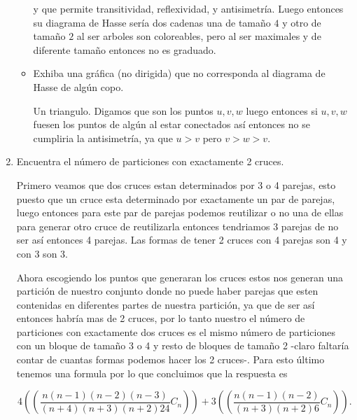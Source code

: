 \documentclass[letterpaper]{article}
\theoremstyle{definition}
\theoremstyle{lemathm}
\theoremstyle{lemademthm}
\newcommand{\pars}[1]{\left( #1 \right) }
\newcommand{\1}{\mathbbm{1}}
\begin{document}
\begin{enumerate}
\begin{itemize}
			y que permite transitividad, reflexividad, y antisimetría. Luego entonces su diagrama de Hasse sería dos cadenas una de tamaño $4$ y otro de tamaño $2$ al ser arboles son coloreables, pero al ser maximales y de diferente tamaño entonces no es graduado.
			
			\item Exhiba una gráfica (no dirigida) que no corresponda al diagrama de Hasse de algún copo.
			
			Un triangulo. Digamos que son los puntos $u,v,w$ luego entonces si $u,v,w$ fuesen los puntos de algún al estar conectados así entonces no se cumpliria la antisimetría, ya que $u>v$ pero $v>w>v$.
			
		\end{itemize}
		
		\item Encuentra el número de particiones con exactamente 2 cruces.
		
		Primero veamos que dos cruces estan determinados por 3 o 4 parejas, esto puesto que un cruce esta determinado por exactamente un par de parejas, luego entonces para este par de parejas podemos reutilizar o no una de ellas para generar otro cruce de reutilizarla entonces tendriamos 3 parejas de no ser así entonces 4 parejas. Las formas de tener 2 cruces con 4 parejas son 4 y con 3 son 3.

		Ahora escogiendo los puntos que generaran los cruces estos nos generan una partición de nuestro conjunto donde no puede haber parejas que esten contenidas en diferentes partes de nuestra partición, ya que de ser así entonces habría mas de 2 cruces, por lo tanto nuestro el número de particiones con exactamente dos cruces es el mismo número de particiones con un bloque de tamaño 3 o 4 y resto de bloques de tamaño 2 -claro faltaría contar de cuantas formas podemos hacer los 2 cruces-. Para esto último tenemos una formula por lo que concluimos que la respuesta es

		\[4\pars{\pars{\frac{n(n-1)(n-2)(n-3)}{(n+4)(n+3)(n+2)24}C_n}} + 3\pars{\pars{\frac{n(n-1)(n-2)}{(n+3)(n+2)6} C_n}}.\]

    \end{enumerate}

	
\end{document}

